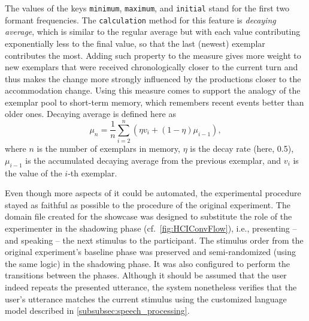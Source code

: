 \noindent
The values of the keys \texttt{minimum}, \texttt{maximum}, and \texttt{initial} stand for the first two formant frequencies.
The \texttt{calculation} method for this feature is \emph{decaying average}, which is similar to the regular average but with each value contributing exponentially less to the final value, so that the last (newest) exemplar contributes the most.
Adding such property to the measure gives more weight to new exemplars that were received chronologically closer to the current turn and thus makes the change more strongly influenced by the productions closer to the accommodation change.
Using this measure comes to support the analogy of the exemplar pool to short-term memory, which remembers recent events better than older ones.
Decaying average is defined here as
%
\begin{equation} 
	\label{eq:decaying_average} 
	\mu_n = \frac{1}{n}\sum_{i = 2}^{n}(\eta v_i + (1 - \eta )\mu_{i-1}), 
\end{equation} 
%
\noindent
where $n$ is the number of exemplars in memory, $\eta$ is the decay rate (here, 0.5), $\mu_{i-1}$ is the accumulated decaying average from the previous exemplar, and $v_i$ is the value of the $i$-th exemplar. 

Even though more aspects of it could be automated, the experimental procedure stayed as faithful as possible to the procedure of the original experiment.
The domain file created for the showcase was designed to substitute the role of the experimenter in the shadowing phase (cf.\ \cref{fig:HCIConvFlow}), i.e., presenting -- and speaking -- the next stimulus to the participant.
The stimulus order from the original experiment's baseline phase was preserved and semi-randomized (using the same logic) in the shadowing phase.
It was also configured to perform the transitions between the phases.
Although it should be assumed that the user indeed repeats the presented utterance, the system nonetheless verifies that the user's utterance matches the current stimulus using the customized language model described in \cref{subsubsec:speech_processing}.


